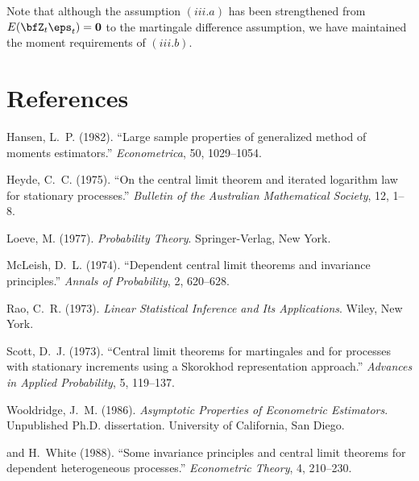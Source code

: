 Note that although the assumption $(iii.a)$ has been strengthened from $E(\bfZ_t\eps_t) = \mathbf{0}$ to the martingale difference assumption, we have maintained the moment requirements of $(iii.b)$.

\section*{References}

\begin{description}
\item Hansen, L.~P. (1982). ``Large sample properties of generalized method of moments estimators.'' \textit{Econometrica}, 50, 1029--1054.

\item Heyde, C.~C. (1975). ``On the central limit theorem and iterated logarithm law for stationary processes.'' \textit{Bulletin of the Australian Mathematical Society}, 12, 1--8.

\item Loeve, M. (1977). \textit{Probability Theory}. Springer-Verlag, New York.

\item McLeish, D.~L. (1974). ``Dependent central limit theorems and invariance principles.'' \textit{Annals of Probability}, 2, 620--628.

\item Rao, C.~R. (1973). \textit{Linear Statistical Inference and Its Applications}. Wiley, New York.

\item Scott, D.~J. (1973). ``Central limit theorems for martingales and for processes with stationary increments using a Skorokhod representation approach.'' \textit{Advances in Applied Probability}, 5, 119--137.

\item Wooldridge, J.~M. (1986). \textit{Asymptotic Properties of Econometric Estimators}. Unpublished Ph.D. dissertation. University of California, San Diego.

\item[\textemdash\textemdash\textemdash] and H.~White (1988). ``Some invariance principles and central limit theorems for dependent heterogeneous processes.'' \textit{Econometric Theory}, 4, 210--230.
\end{description}
